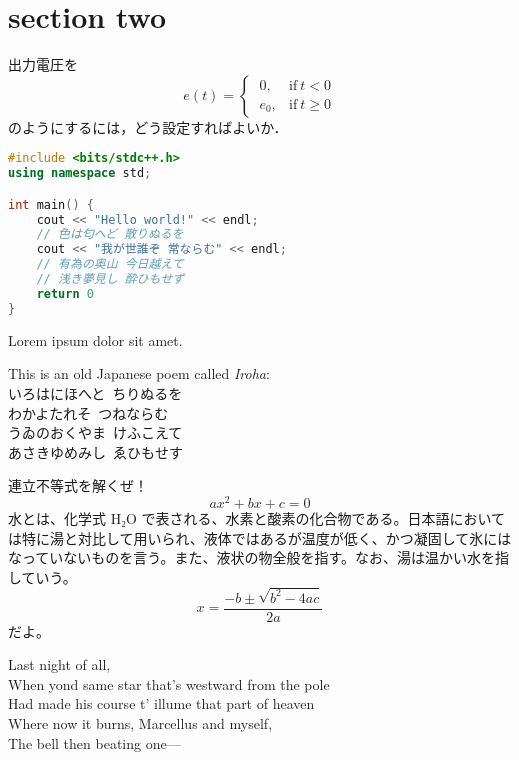 \section{section two}

\begin{tcolorbox}[colback=myteal!5!white,colframe=myteal!75!black,title=\textsf{課題2}]
	出力電圧を
	\begin{equation*}
		e(t) =
		\begin{cases}
			\ 0,   & \text{if}\ t < 0   \\
			\ e_0, & \text{if}\ t \ge 0
		\end{cases}
	\end{equation*}
	のようにするには，どう設定すればよいか．
\end{tcolorbox}

\begin{lstlisting}[language=C++]
#include <bits/stdc++.h>
using namespace std;

int main() {
	cout << "Hello world!" << endl;
	// 色は匂へど 散りぬるを
	cout << "我が世誰ぞ 常ならむ" << endl;
	// 有為の奥山 今日越えて
	// 浅き夢見し 酔ひもせず
	return 0
}
\end{lstlisting}

Lorem ipsum dolor sit amet.

This is an old Japanese poem called \emph{Iroha}: \\
いろはにほへと\ ちりぬるを \\
わかよたれそ\ つねならむ \\
うゐのおくやま\ けふこえて \\
あさきゆめみし\ ゑひもせす

連立不等式を解くぜ！
\begin{equation}
	ax^2 + bx + c = 0
\end{equation}
水とは、化学式 H₂O で表される、水素と酸素の化合物である。日本語においては特に湯と対比して用いられ、液体ではあるが温度が低く、かつ凝固して氷にはなっていないものを言う。また、液状の物全般を指す。なお、湯は温かい水を指していう。
\begin{equation}
	x = \frac{-b \pm \sqrt{b^2 - 4ac}}{2a}
\end{equation}
だよ。

Last night of all, \\
When yond same star that's westward from the pole \\
Had made his course t' illume that part of heaven \\
Where now it burns, Marcellus and myself, \\
The bell then beating one—
